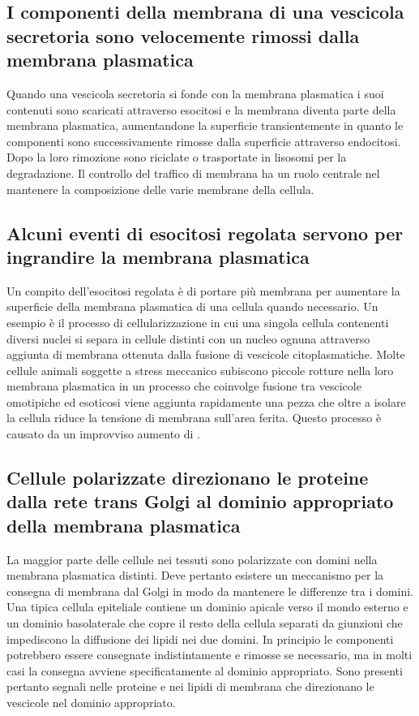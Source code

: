 \subsection{I componenti della membrana di una vescicola secretoria sono velocemente rimossi dalla membrana plasmatica}
Quando una vescicola secretoria si fonde con la membrana plasmatica i suoi contenuti sono scaricati attraverso esocitosi e la membrana diventa parte della membrana plasmatica, 
aumentandone la superficie transientemente in quanto le componenti sono successivamente rimosse dalla superficie attraverso endocitosi. Dopo la loro rimozione sono riciclate o 
trasportate in lisosomi per la degradazione. Il controllo del traffico di membrana ha un ruolo centrale nel mantenere la composizione delle varie membrane della cellula. 
\subsection{Alcuni eventi di esocitosi regolata servono per ingrandire la membrana plasmatica}
Un compito dell'esocitosi regolata \`e di portare pi\`u membrana per aumentare la superficie della membrana plasmatica di una cellula quando necessario. Un esempio \`e il processo di 
cellularizzazione in cui una singola cellula contenenti diversi nuclei si separa in cellule distinti con un nucleo ognuna attraverso aggiunta di membrana ottenuta dalla fusione di 
vescicole citoplasmatiche. Molte cellule animali soggette a stress meccanico subiscono piccole rotture nella loro membrana plasmatica in un processo che coinvolge fusione tra vescicole
omotipiche ed esoticosi viene aggiunta rapidamente una pezza che oltre a isolare la cellula riduce la tensione di membrana sull'area ferita. Questo processo \`e causato da un improvviso
aumento di .
\subsection{Cellule polarizzate direzionano le proteine dalla rete trans Golgi al dominio appropriato della membrana plasmatica}
La maggior parte delle cellule nei tessuti sono polarizzate con domini nella membrana plasmatica distinti. Deve pertanto esistere un meccanismo per la consegna di membrana dal Golgi
in modo da mantenere le differenze tra i domini. Una tipica cellula epiteliale contiene un dominio apicale verso il mondo esterno e un dominio basolaterale che copre il resto della
cellula separati da giunzioni che impediscono la diffusione dei lipidi nei due domini. In principio le componenti potrebbero essere consegnate indistintamente e rimosse se necessario, 
ma in molti casi la consegna avviene specificatamente al dominio appropriato. Sono presenti pertanto segnali nelle proteine e nei lipidi di membrana che direzionano le vescicole nel
dominio appropriato. 
